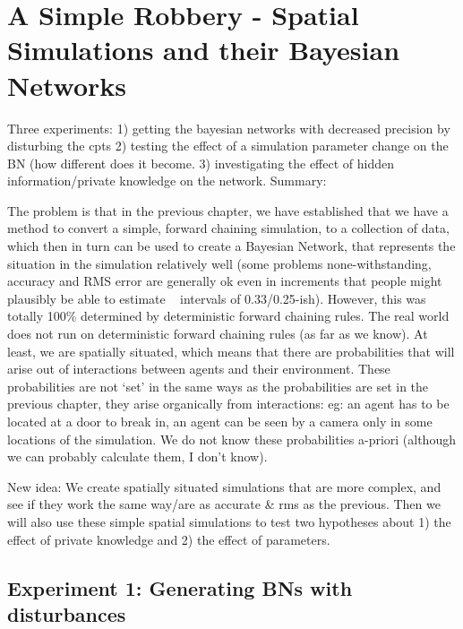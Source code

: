  

\chapter[Simple Spatial Simulations]{A Simple Robbery - Spatial Simulations and their Bayesian Networks}

Three experiments: 1) getting the bayesian networks with decreased precision by disturbing the cpts 2) testing the effect of a simulation parameter change on the BN (how different does it become. 3) investigating the effect of hidden information/private knowledge on the network.
Summary:

 The problem is that in the previous chapter, we have established that we have a method to convert a simple, forward chaining simulation, to a collection of data, which then in turn can be used to create a Bayesian Network, that represents the situation in the simulation relatively well (some problems none-withstanding, accuracy and RMS error are generally ok even in increments that people might plausibly be able to estimate ~ intervals of 0.33/0.25-ish). However, this was totally 100\% determined by deterministic forward chaining rules. The real world does not run on deterministic forward chaining rules (as far as we know). At least, we are spatially situated, which means that there are probabilities that will arise out of interactions between agents and their environment. These probabilities are not `set' in the same ways as the probabilities are set in the previous chapter, they arise organically from interactions: eg: an agent has to be located at a door to break in, an agent can be seen by a camera only in some locations of the simulation. We do not know these probabilities a-priori (although we can probably calculate them, I don't know).
 
New idea: We create spatially situated simulations that are more complex, and see if they work the same way/are as accurate \& rms as the previous. Then we will also use these simple spatial simulations to test two hypotheses about 1) the effect of private knowledge and 2) the effect of parameters.


\section{Experiment 1: Generating BNs with disturbances}


